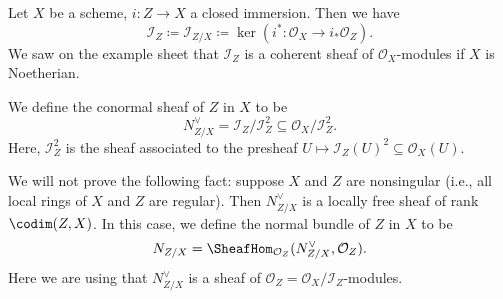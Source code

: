 Let $X$ be a scheme, $i\colon Z\to X$ a closed immersion. Then we have
\[ \mathcal{I}_Z\coloneqq \mathcal{I}_{Z/X}\coloneqq \ker(i^*\colon \mathcal{O}_X\to i_*\mathcal{O}_Z). \]
We saw on the example sheet that $\mathcal{I}_Z$ is a coherent sheaf of $\mathcal{O}_X$-modules
if $X$ is Noetherian.

We define the conormal sheaf of $Z$ in $X$ to be
\[ N_{Z/X}^{\vee} = \mathcal{I}_Z/\mathcal{I}_Z^2 \subseteq \mathcal{O}_X/\mathcal{I}_Z^2. \]
Here, $\mathcal{I}_Z^2$ is the sheaf associated to the presheaf $U\mapsto \mathcal{I}_Z(U)^2 \subseteq \mathcal{O}_X(U)$.

We will not prove the following fact: suppose $X$ and $Z$ are nonsingular (i.e., all
local rings of $X$ and $Z$ are regular). Then $N_{Z/X}^{\vee}$ is a locally free sheaf
of rank $\codim(Z, X)$. In this case, we define the normal bundle of $Z$ in $X$ to
be
\[ N_{Z/X} = \SheafHom_{\mathcal{O}_Z}(N_{Z/X}^{\vee}, \mathcal{O}_Z). \]
Here we are using that $N_{Z/X}^{\vee}$ is a sheaf of $\mathcal{O}_Z = \mathcal{O}_X/\mathcal{I}_Z$-modules.
